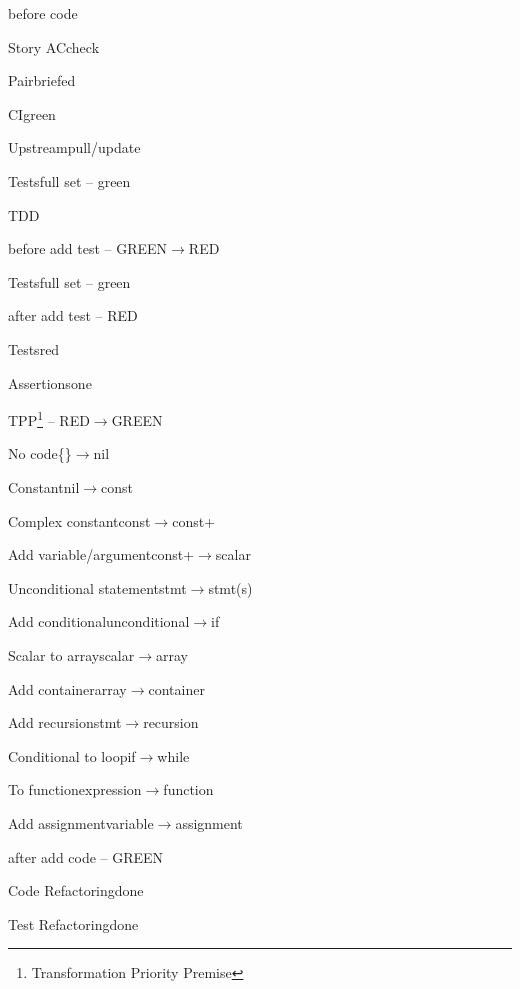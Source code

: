 




\begin{checklist}{before code}
  \item{Story AC}{check}
  \item{Pair}{briefed}
  \item{CI}{green}
  \item{Upstream}{pull/update}
  \item{Tests}{full set -- green}
\end{checklist}

\begin{task}{TDD}
  
  \begin{checklist}{before add test -- GREEN$\rightarrow$RED}
    \item{Tests}{full set -- green}
  \end{checklist}

  \begin{checklist}{after add test -- RED}
    \item{Tests}{red}
    \item{Assertions}{one}
  \end{checklist}

  \begin{checklist}{TPP\footnote{Transformation Priority Premise} -- RED$\rightarrow$GREEN}
    \item{No code}{\{\}$\rightarrow$nil}
    \item{Constant}{nil$\rightarrow$const}
    \item{Complex constant}{const$\rightarrow$const+}
    \item{Add variable/argument}{const+$\rightarrow$scalar}
    \item{Unconditional statement}{stmt$\rightarrow$stmt(s)}
    \item{Add conditional}{unconditional$\rightarrow$if}
    \item{Scalar to array}{scalar$\rightarrow$array}
    \item{Add container}{array$\rightarrow$container}
    \item{Add recursion}{stmt$\rightarrow$recursion}
    \item{Conditional to loop}{if$\rightarrow$while}
    \item{To function}{expression$\rightarrow$function}
    \item{Add assignment}{variable$\rightarrow$assignment}
  \end{checklist}

  \begin{checklist}{after add code -- GREEN}
    \item{Code Refactoring}{done}
    \item{Test Refactoring}{done}
  \end{checklist}

\end{task}

